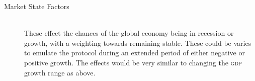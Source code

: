 \begin{description}
\item[Market State Factors] \hfill \\

These effect the chances of the global economy being in recession or growth, with a weighting towards remaining stable. These could be varies to emulate the protocol during an extended period of either negative or positive growth. The effects would be very similar to changing the \textsc{gdp} growth range as above.
\end{description}
